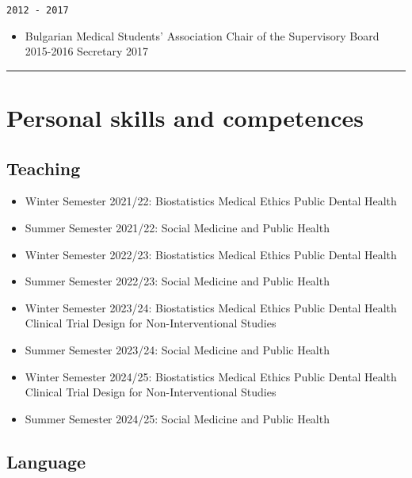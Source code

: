 \documentclass[
  12pt,
  letterpaper,
  DIV=11,
  numbers=noendperiod]{scrartcl}
\providecommand{\tightlist}{%
  \setlength{\itemsep}{0pt}\setlength{\parskip}{0pt}}\usepackage{longtable,booktabs,array}
\begin{document}
\texttt{2012\ -\ 2017}

\begin{itemize}
\tightlist
\item
  Bulgarian Medical Students' Association \textbar{} Chair of the
  Supervisory Board 2015-2016 \textbar{} Secretary 2017
\end{itemize}

\begin{center}\rule{0.5\linewidth}{0.5pt}\end{center}

\section{Personal skills and
competences}\label{personal-skills-and-competences}

\subsection{Teaching}\label{teaching}

\begin{itemize}
\item
  Winter Semester 2021/22: Biostatistics \textbar{} Medical Ethics
  \textbar{} Public Dental Health
\item
  Summer Semester 2021/22: Social Medicine and Public Health
\item
  Winter Semester 2022/23: Biostatistics \textbar{} Medical Ethics
  \textbar{} Public Dental Health
\item
  Summer Semester 2022/23: Social Medicine and Public Health
\item
  Winter Semester 2023/24: Biostatistics \textbar{} Medical Ethics
  \textbar{} Public Dental Health \textbar{} Clinical Trial Design for
  Non-Interventional Studies
\item
  Summer Semester 2023/24: Social Medicine and Public Health
\item
  Winter Semester 2024/25: Biostatistics \textbar{} Medical Ethics
  \textbar{} Public Dental Health \textbar{} Clinical Trial Design for
  Non-Interventional Studies
\item
  Summer Semester 2024/25: Social Medicine and Public Health
\end{itemize}

\subsection{Language}\label{language}
\end{document}
